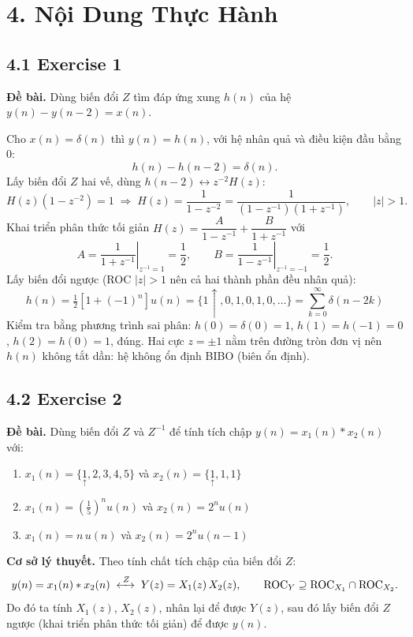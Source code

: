 \documentclass[12pt,a4paper]{article}
\begin{document}
\section*{4. Nội Dung Thực Hành}

\subsection*{4.1 Exercise 1}
\textbf{Đề bài.} Dùng biến đổi $Z$ tìm đáp ứng xung $h(n)$ của hệ $y(n)-y(n-2)=x(n)$.

Cho $x(n)=\delta(n)$ thì $y(n)=h(n)$, với hệ nhân quả và điều kiện đầu bằng 0:
\[
h(n)-h(n-2)=\delta(n).
\]
Lấy biến đổi $Z$ hai vế, dùng $h(n-2)\leftrightarrow z^{-2}H(z)$:
\[
H(z)\left(1-z^{-2}\right)=1 \;\Rightarrow\; H(z)=\frac{1}{1-z^{-2}}=\frac{1}{(1-z^{-1})(1+z^{-1})},\qquad |z|>1.
\]
Khai triển phân thức tối giản $H(z)=\dfrac{A}{1-z^{-1}}+\dfrac{B}{1+z^{-1}}$ với
\[
A=\left.\frac{1}{1+z^{-1}}\right|_{z^{-1}=1}=\frac12,\qquad
B=\left.\frac{1}{1-z^{-1}}\right|_{z^{-1}=-1}=\frac12.
\]
Lấy biến đổi ngược (ROC $|z|>1$ nên cả hai thành phần đều nhân quả):
\[
\boxed{\,h(n)=\tfrac12\left[1+(-1)^n\right]u(n)=\{1\!\uparrow,0,1,0,1,0,\dots\}=\sum_{k=0}^{\infty}\delta(n-2k)\,}
\]
Kiểm tra bằng phương trình sai phân: $h(0)=\delta(0)=1$, $h(1)=h(-1)=0$, $h(2)=h(0)=1$, đúng.
Hai cực $z=\pm1$ nằm trên đường tròn đơn vị nên $h(n)$ không tắt dần: hệ không ổn định BIBO (biên ổn định).

\subsection*{4.2 Exercise 2}
\textbf{Đề bài.} Dùng biến đổi $Z$ và $Z^{-1}$ để tính tích chập $y(n) = x_1(n) * x_2(n)$ với:
\begin{enumerate}
    \item[(a)] $x_1(n) = \{\underset{\uparrow}{1}, 2, 3, 4, 5\}$ và $x_2(n) = \{\underset{\uparrow}{1}, 1, 1\}$
    \item[(b)] $x_1(n) = \left(\tfrac{1}{5}\right)^n u(n)$ và $x_2(n) = 2^n u(n)$
    \item[(c)] $x_1(n) = n\,u(n)$ và $x_2(n) = 2^n u(n-1)$
\end{enumerate}

\noindent\textbf{Cơ sở lý thuyết.} Theo tính chất tích chập của biến đổi $Z$:
\[
y(n) = x_1(n) * x_2(n) \;\xleftrightarrow{\;Z\;}\; Y(z) = X_1(z)\,X_2(z), \qquad \text{ROC}_Y \supseteq \text{ROC}_{X_1} \cap \text{ROC}_{X_2}.
\]
Do đó ta tính $X_1(z)$, $X_2(z)$, nhân lại để được $Y(z)$, sau đó lấy biến đổi $Z$ ngược (khai triển phân thức tối giản) để được $y(n)$.
\end{document}
